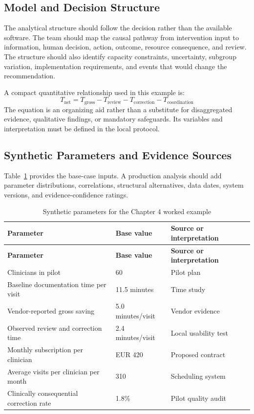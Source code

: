 \subsection{Model and Decision Structure}
The analytical structure should follow the decision rather than the available
software. The team should map the causal pathway from intervention input to
information, human decision, action, outcome, resource consequence, and review.
The structure should also identify capacity constraints, uncertainty, subgroup
variation, implementation requirements, and events that would change the
recommendation.

A compact quantitative relationship used in this example is:
\begin{equation}
T_{\mathrm{net}}=T_{\mathrm{gross}}-T_{\mathrm{review}}-T_{\mathrm{correction}}-T_{\mathrm{coordination}}
\label{eq:comp-ch04-key-relationship}
\end{equation}
The equation is an organizing aid rather than a substitute for disaggregated evidence,
qualitative findings, or mandatory safeguards. Its variables and interpretation must
be defined in the local protocol.

\subsection{Synthetic Parameters and Evidence Sources}
Table~\ref{tab:comp-ch04-parameters} provides the base-case inputs. A
production analysis should add parameter distributions, correlations, structural
alternatives, data dates, system versions, and evidence-confidence ratings.

\begin{longtable}{@{}p{}p{}p{}@{}}
\caption{Synthetic parameters for the Chapter 4 worked example}
\label{tab:comp-ch04-parameters}\\
\toprule
\textbf{Parameter} & \textbf{Base value} & \textbf{Source or interpretation} \\
\midrule
\endfirsthead
\toprule
\textbf{Parameter} & \textbf{Base value} & \textbf{Source or interpretation} \\
\midrule
\endhead
\bottomrule
\endlastfoot
Clinicians in pilot & 60 & Pilot plan \\
Baseline documentation time per visit & 11.5 minutes & Time study \\
Vendor-reported gross saving & 5.0 minutes/visit & Vendor evidence \\
Observed review and correction time & 2.4 minutes/visit & Local usability test \\
Monthly subscription per clinician & EUR 420 & Proposed contract \\
Average visits per clinician per month & 310 & Scheduling system \\
Clinically consequential correction rate & 1.8\% & Pilot quality audit \\
\end{longtable}

